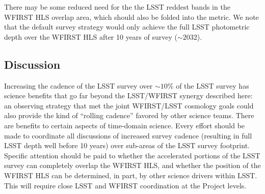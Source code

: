 There may be some reduced need for the the LSST reddest bands in the
WFIRST HLS overlap area, which should also be folded into the metric.
We note that
the default survey strategy would only achieve the full LSST photometric
depth over the WFIRST HLS after 10 years of survey ($\sim2032$).



%
%
%

\subsection{Discussion}
\label{sec:\secname:discussion}

Increasing the cadence of the LSST survey over $\sim10\%$ of the LSST
survey has science benefits that go far beyond the LSST/WFIRST synergy
described here: an observing strategy that met the joint WFIRST/LSST cosmology goals could
also provide the kind of ``rolling cadence'' favored by other science teams.
There are benefits to certain aspects of time-domain
science.  Every effort should be made to coordinate all discussions of
increased survey cadence (resulting in full LSST depth well before 10
years) over sub-areas of the LSST survey footprint.  Specific attention
should be paid to whether the accelerated portions of the LSST survey
can completely overlap the WFIRST HLS, and whether the position of the
WFIRST HLS can be determined, in part, by other science drivers within
LSST.  This will require close LSST and WFIRST coordination at the
Project levels.



\navigationbar
